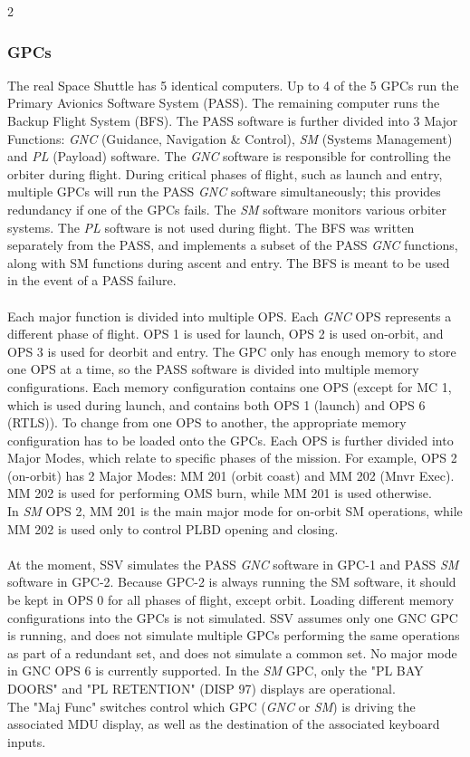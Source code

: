 \documentclass[Space_Shuttle_Vessel_Manual.tex]{subfiles}
\begin{document}
\begin{multicols*}{2}
\subsubsection{GPCs}
The real Space Shuttle has 5 identical computers. Up to 4 of the 5 GPCs run the Primary Avionics Software System (PASS). The remaining computer runs the Backup Flight System (BFS). The PASS software is further divided into 3 Major Functions: \textit{GNC} (Guidance, Navigation \& Control), \textit{SM} (Systems Management) and \textit{PL} (Payload) software. The \textit{GNC} software is responsible for controlling the orbiter during flight. During critical phases of flight, such as launch and entry, multiple GPCs will run the PASS \textit{GNC} software simultaneously; this provides redundancy if one of the GPCs fails. The \textit{SM} software monitors various orbiter systems. The \textit{PL} software is not used during flight. The BFS was written separately from the PASS, and implements a subset of the PASS \textit{GNC} functions, along with SM functions during ascent and entry. The BFS is meant to be used in the event of a PASS failure.\\
\\
Each major function is divided into multiple OPS. Each \textit{GNC} OPS represents a different phase of flight. OPS 1 is used for launch, OPS 2 is used on-orbit, and OPS 3 is used for deorbit and entry. The GPC only has enough memory to store one OPS at a time, so the PASS software is divided into multiple memory configurations. Each memory configuration contains one OPS (except for MC 1, which is used during launch, and contains both OPS 1 (launch) and OPS 6 (RTLS)). To change from one OPS to another, the appropriate memory configuration has to be loaded onto the GPCs. Each OPS is further divided into Major Modes, which relate to specific phases of the mission. For example, OPS 2 (on-orbit) has 2 Major Modes: MM 201 (orbit coast) and MM 202 (Mnvr Exec). MM 202 is used for performing OMS burn, while MM 201 is used otherwise.\\
In \textit{SM} OPS 2, MM 201 is the main major mode for on-orbit SM operations, while MM 202 is used only to control PLBD opening and closing.\\
\\
At the moment, SSV simulates the PASS \textit{GNC} software in GPC-1 and PASS \textit{SM} software in GPC-2. Because GPC-2 is always running the SM software, it should be kept in OPS 0 for all phases of flight, except orbit. Loading different memory configurations into the GPCs is not simulated. SSV assumes only one GNC GPC is running, and does not simulate multiple GPCs performing the same operations as part of a redundant set, and does not simulate a common set. No major mode in GNC OPS 6 is currently supported. In the \textit{SM} GPC, only the "PL BAY DOORS" and "PL RETENTION" (DISP 97) displays are operational.\\
The "Maj Func" switches control which GPC (\textit{GNC} or \textit{SM}) is driving the associated MDU display, as well as the destination of the associated keyboard inputs.


\end{multicols*}
\end{document}
